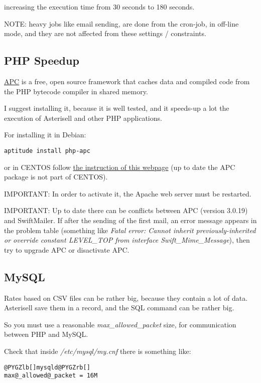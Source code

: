 \documentclass[letterpaper,10pt,english]{sphinxmanual}
\begin{document}
increasing the execution time from 30 seconds to 180 seconds.

NOTE: heavy jobs like email sending, are done from the cron-job, in off-line mode, and they are not affected from these settings / constraints.


\subsection{PHP Speedup}
\label{index:php-speedup}
\href{http://pecl.php.net/package/APC}{APC} is a free, open source framework that caches data and compiled code from the PHP bytecode compiler in shared memory.

I suggest installing it, because it is well tested, and it speeds-up a lot the execution of Asterisell and other PHP applications.

For installing it in Debian:

\begin{Verbatim}[commandchars=@\[\]]
aptitude install php-apc
\end{Verbatim}

or in CENTOS follow \href{http://2bits.com/articles/installing-php-apc-gnulinux-centos-5.html}{the instruction of this webpage} (up to date the APC package is not part of CENTOS).

IMPORTANT: In order to activate it, the Apache web server must be restarted.

IMPORTANT: Up to date there can be conflicts between APC (version 3.0.19) and SwiftMailer. If after the sending of the first mail, an error message appears in the problem table (something like \emph{Fatal error: Cannot inherit previously-inherited or override constant LEVEL\_TOP from interface Swift\_Mime\_Message}), then try to upgrade APC or disactivate APC.


\subsection{MySQL}
\label{index:mysql}
Rates based on CSV files can be rather big, because they contain a lot of data. Asterisell save them in a record, and the SQL command can be rather big.

So you must use a reasonable \emph{max\_allowed\_packet} size, for communication between PHP and MySQL.

Check that inside \emph{/etc/mysql/my.cnf} there is something like:

\begin{Verbatim}[commandchars=@\[\]]
@PYGZlb[]mysqld@PYGZrb[]
max@_allowed@_packet = 16M
\end{Verbatim}
\end{document}
